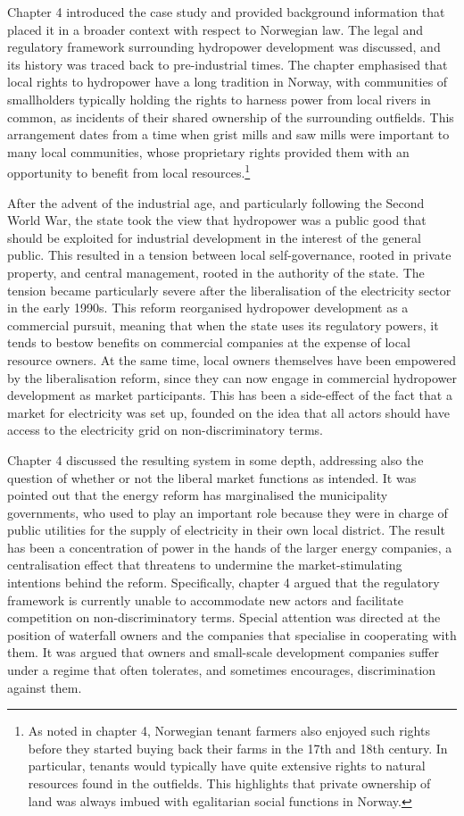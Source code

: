 Chapter 4 introduced the case study and provided background information that placed it in a broader context with respect to Norwegian law. The legal and regulatory framework surrounding hydropower development was discussed, and its history was traced back to pre-industrial times. The chapter emphasised that local rights to hydropower have a long tradition in Norway, with communities of smallholders typically holding the rights to harness power from local rivers in common, as incidents of their shared ownership of the surrounding outfields. This arrangement dates from a time when grist mills and saw mills were important to many local communities, whose proprietary rights provided them with an opportunity to benefit from local resources.\footnote{As noted in chapter 4, Norwegian tenant farmers also enjoyed such rights before they started buying back their farms in the 17th and 18th century. In particular, tenants would typically have quite extensive rights to natural resources found in the outfields. This highlights that private ownership of land was always imbued with egalitarian social functions in Norway.}

After the advent of the industrial age, and particularly following the Second World War, the state took the view that hydropower was a public good that should be exploited for industrial development in the interest of the general public. This resulted in a tension between local self-governance, rooted in private property, and central management, rooted in the authority of the state. The tension became particularly severe after the liberalisation of the electricity sector in the early 1990s. This reform reorganised hydropower development as a commercial pursuit, meaning that when the state uses its regulatory powers, it tends to bestow benefits on commercial companies at the expense of local resource owners. At the same time, local owners themselves have been empowered by the liberalisation reform, since they can now engage in commercial hydropower development as market participants. This has been a side-effect of the fact that a market for electricity was set up, founded on the idea that all actors should have access to the electricity grid on non-discriminatory terms.

Chapter 4 discussed the resulting system in some depth, addressing also the question of whether or not the liberal market functions as intended. It was pointed out that the energy reform has marginalised the municipality governments, who used to play an important role because they were in charge of public utilities for the supply of electricity in their own local district. The result has been a concentration of power in the hands of the larger energy companies, a centralisation effect that threatens to undermine the market-stimulating intentions behind the reform. Specifically, chapter 4 argued that the regulatory framework is currently unable to accommodate new actors and facilitate competition on non-discriminatory terms. Special attention was directed at the position of waterfall owners and the companies that specialise in cooperating with them. It was argued that owners and small-scale development companies suffer under a regime that often tolerates, and sometimes encourages, discrimination against them.

